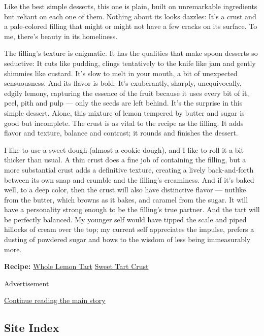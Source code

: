 Like the best simple desserts, this one is plain, built on unremarkable
ingredients but reliant on each one of them. Nothing about its looks
dazzles: It's a crust and a pale-colored filling that might or might not
have a few cracks on its surface. To me, there's beauty in its
homeliness.

The filling's texture is enigmatic. It has the qualities that make spoon
desserts so seductive: It cuts like pudding, clings tentatively to the
knife like jam and gently shimmies like custard. It's slow to melt in
your mouth, a bit of unexpected sensuousness. And its flavor is bold.
It's exuberantly, sharply, unequivocally, edgily lemony, capturing the
essence of the fruit because it uses every bit of it, peel, pith and
pulp --- only the seeds are left behind. It's the surprise in this
simple dessert. Alone, this mixture of lemon tempered by butter and
sugar is good but incomplete. The crust is as vital to the recipe as the
filling. It adds flavor and texture, balance and contrast; it rounds and
finishes the dessert.

I like to use a sweet dough (almost a cookie dough), and I like to roll
it a bit thicker than usual. A thin crust does a fine job of containing
the filling, but a more substantial crust adds a definitive texture,
creating a lively back-and-forth between its own snap and crumble and
the filling's creaminess. And if it's baked well, to a deep color, then
the crust will also have distinctive flavor --- nutlike from the butter,
which browns as it bakes, and caramel from the sugar. It will have a
personality strong enough to be the filling's true partner. And the tart
will be perfectly balanced. My younger self would have tipped the scale
and piped hillocks of cream over the top; my current self appreciates
the impulse, prefers a dusting of powdered sugar and bows to the wisdom
of less being immeasurably more.

\textbf{Recipe:}
\href{https://cooking.nytimes3xbfgragh.onion/recipes/1019239-whole-lemon-tart}{Whole
Lemon Tart} \textbar{}
\href{https://cooking.nytimes3xbfgragh.onion/recipes/1019240-sweet-tart-crust}{Sweet
Tart Crust}

Advertisement

\protect\hyperlink{after-bottom}{Continue reading the main story}

\hypertarget{site-index}{%
\subsection{Site Index}\label{site-index}}

